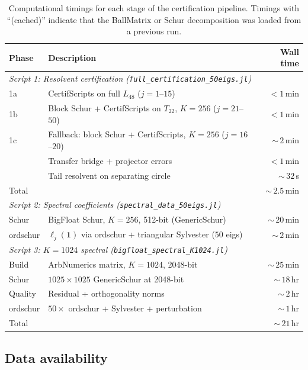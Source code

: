 \documentclass[11pt]{article}
\begin{document}
\begin{table}[ht]
\centering
\caption{Computational timings for each stage of the certification pipeline.
Timings with ``(cached)'' indicate that the BallMatrix or Schur decomposition was loaded from a previous run.}
\label{S-tab:timings}
\begin{tabular}{lp{7.5cm}r}
\toprule
Phase & Description & Wall time \\
\midrule
\multicolumn{3}{l}{\emph{Script 1: Resolvent certification (\texttt{full\_certification\_50eigs.jl})}} \\
\quad 1a & CertifScripts on full $L_{48}$ ($j = 1$--$15$) & $<\!1$\,min \\
\quad 1b & Block Schur + CertifScripts on $T_{22}$, $K\!=\!256$ ($j = 21$--$50$) & $<\!1$\,min \\
\quad 1c & Fallback: block Schur + CertifScripts, $K\!=\!256$ ($j = 16$--$20$) & ${\sim}\,2$\,min \\
\quad 2 & Transfer bridge + projector errors & $<\!1$\,min \\
\quad 3 & Tail resolvent on separating circle & ${\sim}\,32$\,s \\
\quad Total & & ${\sim}\,2.5$\,min \\
\midrule
\multicolumn{3}{l}{\emph{Script 2: Spectral coefficients (\texttt{spectral\_data\_50eigs.jl})}} \\
\quad Schur & BigFloat Schur, $K\!=\!256$, 512-bit (GenericSchur) & ${\sim}\,20$\,min \\
\quad ordschur & $\ell_j(\mathbf{1})$ via ordschur + triangular Sylvester ($50$ eigs) & ${\sim}\,2$\,min \\
\midrule
\multicolumn{3}{l}{\emph{Script 3: $K\!=\!1024$ spectral (\texttt{bigfloat\_spectral\_K1024.jl})}} \\
\quad Build & ArbNumerics matrix, $K\!=\!1024$, 2048-bit & ${\sim}\,25$\,min \\
\quad Schur & $1025 \times 1025$ GenericSchur at 2048-bit & ${\sim}\,18$\,hr \\
\quad Quality & Residual + orthogonality norms & ${\sim}\,2$\,hr \\
\quad ordschur & $50 \times$ ordschur + Sylvester + perturbation & ${\sim}\,1$\,hr \\
\quad Total & & ${\sim}\,21$\,hr \\
\bottomrule
\end{tabular}
\end{table}

\subsection*{Data availability}
\end{document}
